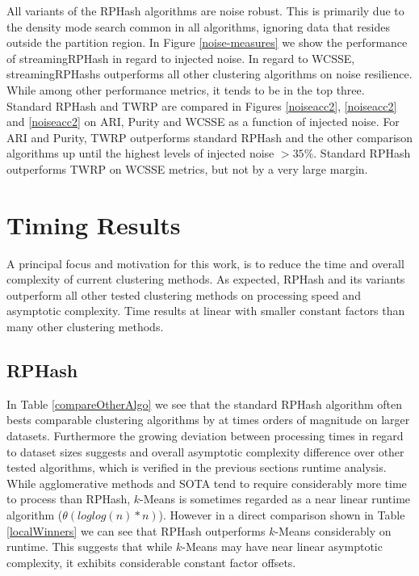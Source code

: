 All variants of the \textsf{RPHash} algorithms are noise robust.  This is primarily due to the density mode
search common in all algorithms, ignoring data that resides outside the partition region.  In Figure
\ref{noise-measures} we show the performance of \textsf{streamingRPHash} in regard to injected noise.  In
regard to WCSSE, \textsf{streamingRPHash}s outperforms all other clustering algorithms on noise resilience.  While among
other performance metrics, it tends to be in the top three.  Standard \textsf{RPHash} and \textsf{TWRP} are compared
in Figures \ref{noiseacc2}, \ref{noiseacc2} and \ref{noiseacc2} on ARI, Purity and WCSSE as a function of
injected noise.  For ARI and Purity, \textsf{TWRP} outperforms standard \textsf{RPHash} and the other comparison
algorithms up until the highest levels of injected noise $>35\%$.  Standard \textsf{RPHash} outperforms \textsf{TWRP}
on WCSSE metrics, but not by a very large margin.

\section{Timing Results}

A principal focus and motivation for this work, is to reduce the time and overall complexity of
current clustering methods.  As expected, \textsf{RPHash} and its variants outperform all other tested
clustering methods on processing speed and asymptotic complexity.  Time results at linear with
smaller constant factors than many other clustering methods.

\subsection{RPHash}\label{rptiming}

In Table \ref{compareOtherAlgo} we see that the standard \textsf{RPHash} algorithm often bests comparable
clustering algorithms by at times orders of magnitude on larger datasets.  Furthermore the growing
deviation between processing times in regard to dataset sizes suggests and overall asymptotic
complexity difference over other tested algorithms, which is verified in the previous sections
runtime analysis.  While agglomerative methods and SOTA tend to require considerably more time to
process than \textsf{RPHash}, $k$-Means is sometimes regarded as a near linear runtime algorithm
($\theta(loglog(n)*n)$).  However in a direct comparison shown in Table \ref{localWinners} we can
see that \textsf{RPHash} outperforms $k$-Means considerably on runtime.  This suggests that while $k$-Means may
have near linear asymptotic complexity, it exhibits considerable constant factor offsets.

